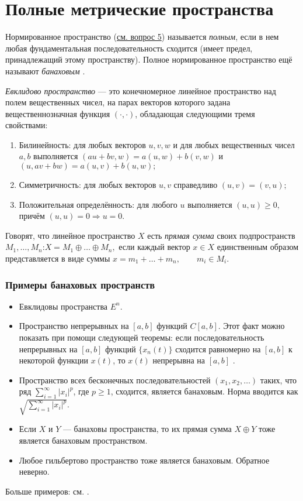 \section{Полные метрические пространства}
\label{sec:q-2}
Нормированное пространство (\hyperref[sec:q-1]{см. вопрос 5}) называется \textit{полным}, если в нем любая фундаментальная последовательность сходится (имеет предел, принадлежащий этому пространству). Полное нормированное пространство ещё называют \textit{банаховым} \cite[с.~42]{trenogin}.

\textit{Евклидово пространство} --- это конечномерное линейное пространство над полем вещественных чисел, на парах векторов которого задана вещественнозначная функция $(\cdot, \cdot)$, обладающая следующими тремя свойствами:
\begin{enumerate}
	\itemsep0pt
	\item Билинейность: для любых векторов $u,v,w$ и для любых вещественных чисел $a, b$ выполняется $(au+bv, w)=a(u,w)+b(v,w)$ и $(u, av+bw)=a(u,v)+b(u,w);$
	\item Симметричность: для любых векторов $u,v$ справедливо $(u,v)=(v,u);$
	\item Положительная определённость: для любого $u$ выполняется $ (u,u)\geqslant 0,$ причём $(u,u) = 0\Rightarrow u=0.$
\end{enumerate}

Говорят, что линейное пространство $X$ есть \textit{прямая сумма} своих подпространств $M_1, \dots, M_n$:$X = M_1 \oplus \dots \oplus M_n,$ если каждый вектор $x \in X$ единственным образом представляется в виде суммы
$x = m_1 + \dots + m_n, \qquad m_i \in M_i.$


\subsubsection*{Примеры банаховых пространств}
\begin{itemize}
	\itemsep0pt
	\item Евклидовы пространства $E^n$.
	\item Пространство непрерывных на $[a, b]$ функций $C[a, b]$. Этот факт можно показать при помощи следующей теоремы: если последовательность непрерывных на $[a, b]$ функций $\{x_n(t)\}$ сходится равномерно на $[a, b]$ к некоторой функции $x(t)$, то $x(t)$ непрерывна на $[a, b]$ \cite[с.~43]{trenogin}.
	\item Пространство всех бесконечных последовательностей $(x_1, x_2, \dots)$ таких, что ряд $ \sum_{i = 1}^{\infty}|x_i|^p$, где $p \geqslant 1$, сходится, является банаховым. Норма вводится как $ \sqrt{\sum_{i = 1}^{\infty}|x_i|^p}$.
	\item Если $X$ и $Y$ --- банаховы пространства, то их прямая сумма $X \oplus Y$ тоже является банаховым пространством.
	\item Любое гильбертово пространство тоже является банаховым. Обратное неверно.
\end{itemize}
Больше примеров: см. \cite{wiki-banach-space}.